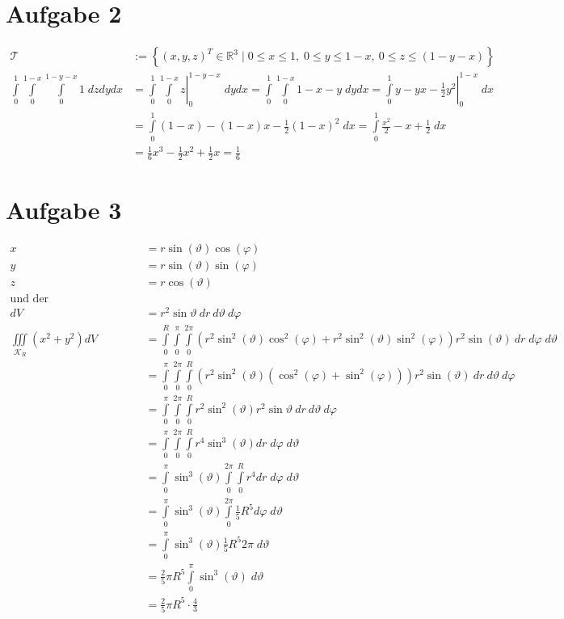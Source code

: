 \documentclass[10pt,a4paper,parskip=half]{scrartcl}
\newcommand{\R}{\mathbb{R}}
\begin{document}
\section*{Aufgabe 2}
\begin{align*}
\mathcal{T} &:= \left\lbrace (x,y,z)^T \in \R^3 \mid 0\leq x \leq 1, \; 0\leq y \leq 1 - x, \: 0 \leq z \leq (1 - y - x)\right\rbrace \\
   \int\limits^1_0 \int\limits^{1-x}_0 \int\limits^{1-y - x}_{0} 1 \;dzdydx &=  \left.  \int\limits^1_0 \int\limits^{1-x}_0  z \right|^{1-y-x}_{0} \;dydx =   \int\limits^1_0 \int\limits^{1-x}_0  1-x-y \;dydx = \left. \int\limits^{1}_{0}  y - yx - \frac 12 y^2 \right|^{1-x}_{0} \;dx \\
   &= \int\limits^{1}_{0} (1-x) - (1-x)x - \frac 12 (1-x)^2 \; dx =  \int\limits^{1}_{0} \frac{x^2}{2} - x + \frac 12  \; dx \\
   &= \frac 16 x^3 - \frac 12 x^2 + \frac 12 x = \frac 16
\end{align*}
\section*{Aufgabe 3}
\begin{align*}
x &= r \sin( \vartheta ) \cos(\varphi) \\
y &= r \sin(\vartheta) \sin(\varphi)\\
z &= r \cos( \vartheta)\\
\text{und der Funktionaldeterminanten} \\
dV &= r^2 \sin \vartheta~ dr ~d\vartheta ~d\varphi \\
\iiint\limits_{\mathcal{K}_R} \left( x^2 + y^2 \right) dV &= \int\limits_{0}^{R}\int\limits_{0}^{\pi} \int\limits_{0}^{2\pi} \left( r^2\sin^2(\vartheta)\cos^2(\varphi) + r^2\sin^2(\vartheta)\sin^2(\varphi) \right) r^2 \sin(\vartheta)~ dr \; d\varphi \; d\vartheta\\ 
&= \int\limits_{0}^{\pi} \int\limits_{0}^{2\pi}\int\limits_{0}^{R} \left( r^2\sin^2(\vartheta) \left( \cos^2(\varphi) + \sin^2(\varphi) \right) \right)  r^2 \sin(\vartheta)~ dr ~d\vartheta ~d\varphi\\
&= \int\limits_{0}^{\pi} \int\limits_{0}^{2\pi}\int\limits_{0}^{R}  r^2\sin^2(\vartheta)  r^2 \sin \vartheta~ dr ~d\vartheta ~d\varphi\\
&= \int\limits_{0}^{\pi} \int\limits_{0}^{2\pi}\int\limits_{0}^{R}  r^4\sin^3(\vartheta) dr \; d\varphi \; d\vartheta\\
&= \int\limits_{0}^{\pi} \sin^3(\vartheta) \int\limits_{0}^{2\pi}\int\limits_{0}^{R} r^4 dr \; d\varphi \; d\vartheta\\
&= \int\limits_{0}^{\pi} \sin^3(\vartheta)  \int\limits_{0}^{2\pi} \frac 15 R^5 d\varphi \; d\vartheta\\
&= \int\limits_{0}^{\pi} \sin^3(\vartheta)\frac 15 R^5 2\pi \; d\vartheta\\
&= \frac 25 \pi R^5 \int\limits_0^{\pi} \sin^3(\vartheta) \; d\vartheta\\
&= \frac 25 \pi R^5 \cdot \frac 43
\end{align*}
\end{document}
